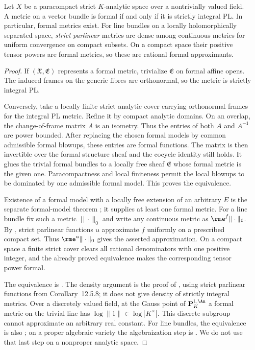 \begin{theorem}
\label{thm:cld-formal-pl-comparison}
Let $X$ be a paracompact strict $K$-analytic space over a nontrivially
valued field.  A metric on a vector bundle is formal if and only if it is
strictly integral PL.  In particular, formal metrics exist.  For line
bundles on a locally holomorphically separated space, \emph{strict
parlinear} metrics are dense among continuous metrics for uniform
convergence on compact subsets.  On a compact space their positive tensor
powers are formal metrics, so these are rational formal approximants.
\end{theorem}
\begin{proof}
If $(\mathfrak X,\mathfrak E)$ represents a formal metric, trivialize
$\mathfrak E$ on formal affine opens.  The induced frames on the generic
fibres are orthonormal, so the metric is strictly integral PL.

Conversely, take a locally finite strict analytic cover carrying orthonormal
frames for the integral PL metric.  Refine it by compact analytic domains.
On an overlap, the change-of-frame matrix $A$ is an isometry.  Thus the
entries of both $A$ and $A^{-1}$ are power bounded.  After replacing the
chosen formal models by common admissible formal blowups, these entries are
formal functions.  The matrix is then invertible over the formal structure
sheaf and the cocycle identity still holds.  It glues the trivial formal
bundles to a locally free sheaf $\mathfrak E$ whose formal metric is the
given one.  Paracompactness and local finiteness permit the local blowups to
be dominated by one admissible formal model.  This proves the equivalence.

Existence of a formal model with a locally free extension of an arbitrary
$E$ is the separate formal-model theorem
\cite[Corollary~B.1.6 and Theorem~B.1.8]{CLD25}; it supplies at least
one formal metric.  For a line bundle fix such a metric $\|\cdot\|_0$
and write any continuous metric as $\rme^f\|\cdot\|_0$.
By \cite[Corollary~12.5.8]{CLD25}, strict parlinear functions $u$
approximate $f$ uniformly on a prescribed compact set.  Thus
$\rme^u\|\cdot\|_0$ gives the asserted approximation.
On a compact space a finite strict cover clears all rational
denominators with one positive integer, and the already proved
equivalence makes the corresponding tensor power formal.

The equivalence is \cite[Proposition~17.7.5]{CLD25}.  The density
argument is the proof of \cite[Corollary~17.7.6]{CLD25}, using strict
parlinear functions from Corollary~12.5.8; it does not give density of
strictly integral metrics.  Over a discretely valued field, at
the Gauss point of $\mathbf P^{1,\An}_K$ a formal metric on the trivial
line has $\log\|1\|\in\log|K^\times|$.  This discrete subgroup cannot
approximate an arbitrary real constant.  For line bundles, the equivalence is also
\cite[Proposition~2.10]{GM19}; on a proper algebraic variety the
algebraization step is \cite[Theorem~1.1]{GM19}.  We do not use that last
step on a nonproper analytic space.
\end{proof}

